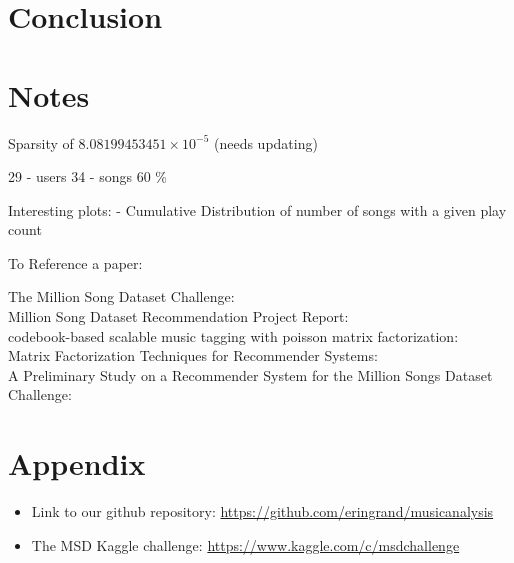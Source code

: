 \documentclass[12pt,preprint]{aastex}
\begin{document}
\section{Conclusion}



\section{Notes}
Sparsity of $8.08199453451\times 10^{-5}$ (needs updating)



29 - users
34 - songs 
60 \%

Interesting plots:
- Cumulative Distribution of number of songs with a given play count

To Reference a paper: 

The Million Song Dataset Challenge: \citep{McFee:2012:MSD:2187980.2188222} \\
Million Song Dataset Recommendation Project Report: \citep{li2012million} \\
codebook-based scalable music tagging with poisson matrix factorization: \citep{liangcodebook} \\
Matrix Factorization Techniques for Recommender Systems: \citep{koren2009matrix} \\
A Preliminary Study on a Recommender System for the Million Songs Dataset Challenge: \citep{aiolli2013preliminary} \\





\small{
\section{Appendix}

\begin{itemize}

  \item Link to our github repository: \url{https://github.com/eringrand/musicanalysis}
  \item The MSD Kaggle challenge: \url{https://www.kaggle.com/c/msdchallenge}

\end{itemize}
}
\end{document}
